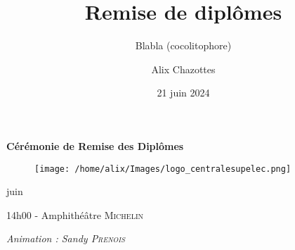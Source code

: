 \documentclass{beamer}
\title[Remise de diplômes]{Remise de diplômes}
\subtitle{Blabla (cocolitophore)}
\author{Alix Chazottes}
\institute{CentraleSupélec}
\date{21 juin 2024}
\begin{document}
\begin{frame}[plain]
  \begin{center}
    \vspace*{0.5cm}
    {\Large \textbf{Cérémonie de Remise des Diplômes}} \\
    \vspace*{0.3cm}
    {\large 
    \begin{figure}
      \texttt{[image: /home/alix/Images/logo\_centralesupelec.png]}
    \end{figure}
    
    \vspace*{0.5cm}
     juin  \\
    }
    
    \vspace*{0.3cm}
    14h00 - Amphithéâtre \textsc{Michelin} \\
    \vspace*{0.7cm}
    
    \textit{ Animation : Sandy \textsc{Prenois}}
  \end{center}

\end{frame}


\end{document}

